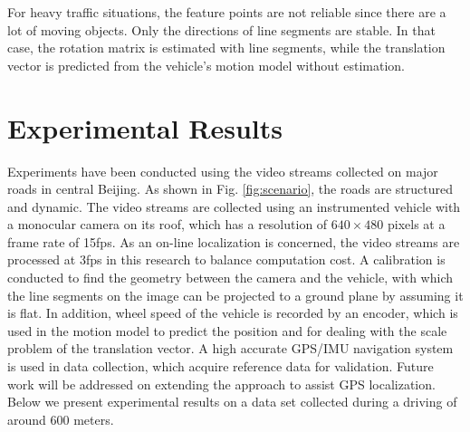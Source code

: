 \documentclass[letterpaper, 10 pt, conference]{ieeeconf}  %
\begin{document}

For heavy traffic situations, the feature points are not reliable since there are a lot of moving objects. Only the directions of line segments are stable. In that case, the rotation matrix is estimated with line segments, while the translation vector is predicted from the vehicle's motion model without estimation.


\section{Experimental Results}
\label{sec_experiments}
Experiments have been conducted using the video streams collected on major roads in central Beijing. As shown in Fig. \ref{fig:scenario}, the roads are structured and dynamic. The video streams are collected using an instrumented vehicle with a monocular camera on its roof, which has a resolution of $640\times480$ pixels at a frame rate of 15fps. As an on-line localization is concerned, the video streams are processed at 3fps in this research to balance computation cost. A calibration is conducted to find the geometry between the camera and the vehicle, with which the line segments on the image can be projected to a ground plane by assuming it is flat. In addition, wheel speed of the vehicle is recorded by an encoder, which is used in the motion model to predict the position and for dealing with the scale problem of the translation vector. A high accurate GPS/IMU navigation system is used in data collection, which acquire reference data for validation. Future work will be addressed on extending the approach to assist GPS localization. Below we present experimental results on a data set collected during a driving of around 600 meters.
\end{document}
